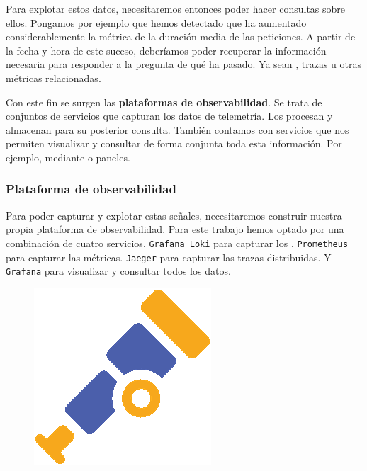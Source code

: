 Para explotar estos datos, necesitaremos entonces poder hacer consultas sobre ellos. Pongamos por ejemplo que hemos detectado que ha aumentado considerablemente la métrica de la duración media de las peticiones. A partir de la fecha y hora de este suceso, deberíamos poder recuperar la información necesaria para responder a la pregunta de qué ha pasado. Ya sean , trazas u otras métricas relacionadas.

Con este fin se surgen las \textbf{plataformas de observabilidad}. Se trata de conjuntos de servicios que capturan los datos de telemetría. Los procesan y almacenan para su posterior consulta. También contamos con servicios que nos permiten visualizar y consultar de forma conjunta toda esta información. Por ejemplo, mediante  o paneles.

\subsubsection{Plataforma de observabilidad}

Para poder capturar y explotar estas señales, necesitaremos construir nuestra propia plataforma de observabilidad. Para este trabajo hemos optado por una combinación de cuatro servicios. \texttt{Grafana Loki} para capturar los . \texttt{Prometheus} para capturar las métricas. \texttt{Jaeger} para capturar las trazas distribuidas. Y \texttt{Grafana} para visualizar y consultar todos los datos.

\begin{figure}
  \vspace{-10pt}
  \hspace{10pt}
  \centering
  \includegraphics[scale=0.5]{cap_despliegue/images/opentelemetry-logo}
\end{figure}

